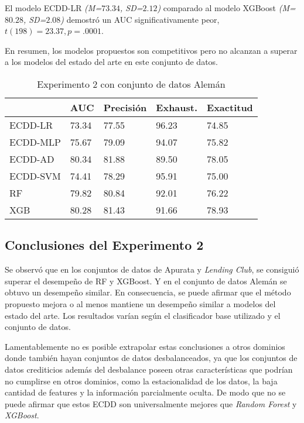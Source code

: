 El modelo ECDD-LR \textit{(M=$73.34$, SD=$2.12$)} comparado al modelo \ac{XGBoost} \textit{(M=$80.28$, SD=$2.08$)} demostró un \ac{AUC} significativamente peor, $t(198)=23.37, p=.0001$.

En resumen, los modelos propuestos son competitivos pero no alcanzan a superar a los modelos del estado del arte en este conjunto de datos.

\begin{table}[htbp]
\centering
\caption{Experimento 2 con conjunto de datos Alemán}
\label{tab:german-proc2}
\begin{tabularx}{0.75\textwidth}{|l|Y Y Y Y|}
				\hline
				& AUC		& Precisión	& Exhaust.		& Exactitud	\\
				\hline
ECDD-LR			& 73.34		& 77.55		& 96.23			& 74.85		\\		%
ECDD-MLP		& 75.67		& 79.09		& 94.07			& 75.82		\\		%
ECDD-AD			& 80.34		& 81.88		& 89.50			& 78.05		\\		%
ECDD-SVM		& 74.41		& 78.29		& 95.91			& 75.00		\\		%
				\hline
RF				& 79.82		& 80.84		& 92.01			& 76.22		\\		%
XGB				& 80.28		& 81.43		& 91.66			& 78.93		\\		%
				\hline
\end{tabularx}
\end{table}

\subsection{Conclusiones del Experimento 2}

Se observó que en los conjuntos de datos de Apurata y \textit{Lending Club}, se consiguió superar el desempeño de \ac{RF} y \ac{XGBoost}. Y en el conjunto de datos Alemán se obtuvo un desempeño similar. En consecuencia, se puede afirmar que el método propuesto mejora o al menos mantiene un desempeño similar a modelos del estado del arte. Los resultados varían según el clasificador base utilizado y el conjunto de datos.

Lamentablemente no es posible extrapolar estas conclusiones a otros dominios donde también hayan conjuntos de datos desbalanceados, ya que los conjuntos de datos crediticios además del desbalance poseen otras características que podrían no cumplirse en otros dominios, como la estacionalidad de los datos, la baja cantidad de features y la información parcialmente oculta. De modo que no se puede afirmar que estos \ac{ECDD} son universalmente mejores que \textit{Random Forest} y \textit{XGBoost}.

